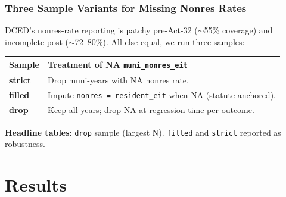 \documentclass[xcolor = x11names, compress, aspectratio = 169]{beamer}
\begin{document}
    \begin{frame}
    \frametitle{Three Sample Variants for Missing Nonres Rates}
        \footnotesize
        DCED's nonres-rate reporting is patchy pre-Act-32 ($\sim$55\%
        coverage) and incomplete post ($\sim$72--80\%). All else equal,
        we run three samples:
        \medskip
        \scriptsize
        \renewcommand{\arraystretch}{1.20}
        \setlength{\tabcolsep}{8pt}
        \begin{tabular}{ll}
            \toprule
            Sample & Treatment of NA \texttt{muni\_nonres\_eit} \\
            \midrule
            \textbf{strict} & Drop muni-years with NA nonres rate. \\
            \textbf{filled} & Impute \texttt{nonres = resident\_eit} when NA (statute-anchored). \\
            \textbf{drop}   & Keep all years; drop NA at regression time per outcome. \\
            \bottomrule
        \end{tabular}
        \medskip
        \footnotesize
        \textbf{Headline tables}: \texttt{drop} sample (largest N).
        \texttt{filled} and \texttt{strict} reported as robustness.
    \end{frame}

\section{Results}
\end{document}
